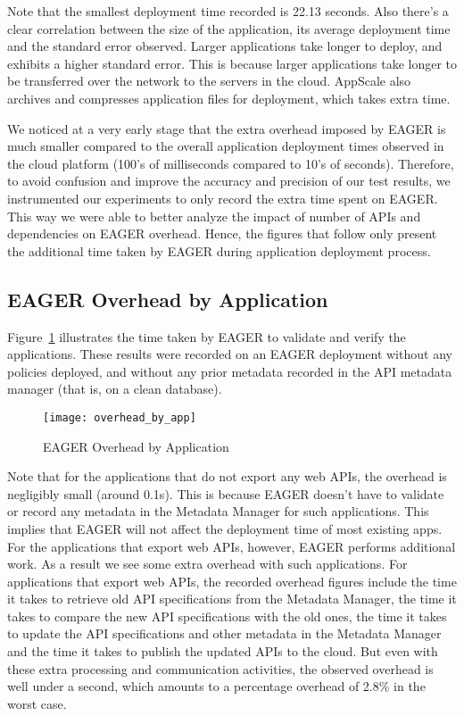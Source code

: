 Note that the smallest deployment time recorded is 22.13 seconds. Also there's a clear correlation between the
size of the application, its average deployment time and the standard error observed. Larger applications take longer to deploy,
and exhibits a higher standard error. This is because larger applications take longer to be transferred over the network to the 
servers in the cloud. AppScale also archives and compresses application files for deployment, which takes extra
time.

We noticed at a very early stage that the extra overhead imposed by EAGER is much smaller compared to the overall application
deployment times observed in the cloud platform (100's of milliseconds compared to 10's of seconds). 
Therefore, to avoid confusion and improve the accuracy and precision of our test results, we instrumented our experiments to
only record the extra time spent on EAGER. This way we were able to better analyze the impact of number of APIs and dependencies
on EAGER overhead. Hence, the figures that follow only present the additional time taken by EAGER during application
deployment process.

\subsection{EAGER Overhead by Application}

Figure~\ref{fig:overhead_by_app} illustrates the time taken by EAGER to validate and verify the applications.
These results were recorded on an EAGER deployment without any policies deployed, and without any prior
metadata recorded in the API metadata manager (that is, on a clean database).

\begin{figure}
\centering
\texttt{[image: overhead\_by\_app]}
\caption{EAGER Overhead by Application}
\label{fig:overhead_by_app}
\end{figure}

Note that for the applications that do not export any web APIs, the overhead is negligibly small (around 0.1s). This is because EAGER
doesn't have to validate or record any metadata in the Metadata Manager for such applications. This implies that EAGER will not affect 
the deployment time of most existing apps. For the applications that 
export web APIs, however, EAGER performs additional work. As a result we see some extra overhead with such applications. 
For applications that export web APIs, the recorded overhead figures include the time it takes to retrieve old API specifications from the
Metadata Manager, the time it takes to compare the new API specifications with the old ones, the time it takes to update the API specifications
and other metadata in the Metadata Manager and the time it takes to publish the updated APIs to the cloud.
But even with these extra processing and communication activities, the observed overhead is well under a second,
which amounts to a percentage overhead of 2.8\% in the worst case.

